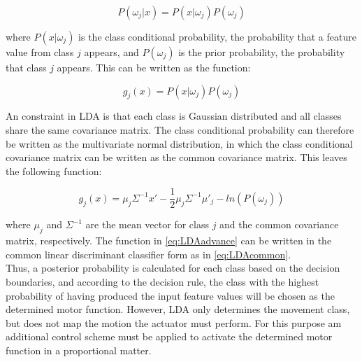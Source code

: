 \begin{equation}
	P(\omega_{j}|x) = P(x|\omega_{j})P(\omega_{j})
\end{equation}

where $P(x|\omega_{j})$ is the class conditional probability, the probability that a feature value from class $j$ appears, and $P(\omega_{j})$ is the prior probability, the probability that class $j$ appears. This can be written as the function:

\begin{equation}
	g_{j}(x) = P(x|\omega_{j})P(\omega_{j})
\end{equation}

An constraint in LDA is that each class is Gaussian distributed and all classes share the same covariance matrix. The class conditional probability can therefore be written as the multivariate normal distribution, in which the class conditional covariance matrix can be written as the common covariance matrix. This leaves the following function:

\begin{equation}\label{eq:LDAadvance}
	g_{j}(x) = \mu_{j}\Sigma^{-1}x'-\frac{1}{2}\mu_{j}\Sigma^{-1}\mu'_{j}-ln(P(\omega_{j}))
\end{equation}

where $\mu_{j}$ and $\Sigma^{-1}$ are the mean vector for class $j$ and the common covariance matrix, respectively. The function in \eqref{eq:LDAadvance} can be written in the common linear discriminant classifier form as in \eqref{eq:LDAcommon}. \cite{Scheme2013}\\
Thus, a posterior probability is calculated for each class based on the decision boundaries, and according to the decision rule, the class with the highest probability of having produced the input feature values will be chosen as the determined motor function. However, LDA only determines the movement class, but does not map the motion the actuator must perform. For this purpose am additional control scheme must be applied to activate the determined motor function in a proportional matter. \cite{Fougner2012}

%
%
%
